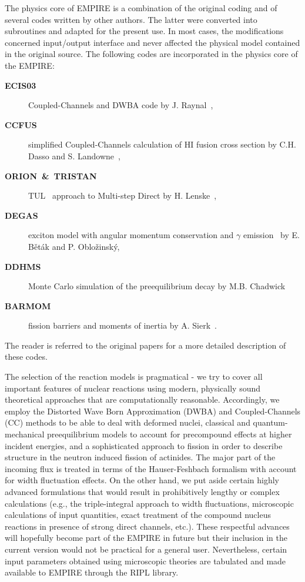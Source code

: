 \documentclass[twocolumn,amsmath,amssymb,10pt,groupedaddress,letter]{revtex4}
\begin{document}
The physics core of EMPIRE is a combination of the original coding and of several codes written by other authors. The latter were converted into subroutines and adapted for the present use.
In most cases, the modifications concerned input/output interface
and never affected the physical model contained in the original source.
The following codes are incorporated in the physics core of the EMPIRE:
\begin{description}
\item [\textbf{ECIS03}]Coupled-Channels
and DWBA code by J. Raynal~\cite{ECIS},
\item [\textbf{CCFUS}]simplified Coupled-Channels calculation
of HI fusion cross section by C.H. Dasso and S. Landowne~\cite{CCFUS},
\item [\textbf{ORION~\&~TRISTAN}]TUL~\cite{TUL}
approach to Multi-step Direct by H. Lenske~\cite{ORTRI},
\item [\textbf{DEGAS}]exciton model with angular momentum
conservation and $\gamma$ emission~\cite{Degas} by E. B\v et\' ak
and P. Oblo\v zinsk\' y,
\item [\textbf{DDHMS}]Monte Carlo simulation of the preequilibrium
decay by M.B. Chadwick~\cite{DDHMScode}
\item [\textbf{BARMOM}]fission barriers and moments of inertia
by A. Sierk~\cite{sierk}.
\end{description}
The reader is referred to the original papers for a more detailed description of these codes.

The selection of the reaction models is pragmatical - we try to cover all important features of nuclear reactions using modern, physically sound theoretical approaches  that are computationally reasonable.  Accordingly,
we employ the Distorted Wave Born Approximation (DWBA) and Coupled-Channels (CC) methods to be able to deal with deformed nuclei, classical and quantum-mechanical preequilibrium models to account for precompound effects at higher incident energies, and a sophisticated approach to fission in order to describe structure in the neutron induced fission of actinides. The major part of the incoming flux is treated in terms of the Hauser-Feshbach formalism with account for width fluctuation effects. On the other hand, we put aside certain highly advanced formulations that would result in prohibitively lengthy or complex calculations (e.g., the triple-integral approach to width fluctuations, microscopic calculations of input quantities, exact treatment of the compound nucleus reactions in presence of strong direct channels, etc.). These respectful advances will hopefully become part of the EMPIRE in future but their inclusion in the current version would not be practical for a general user. Nevertheless, certain input parameters obtained using microscopic theories  are tabulated and made available to EMPIRE through the RIPL library.
\end{document}
